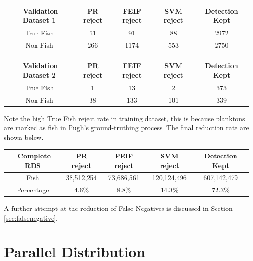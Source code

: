 \documentclass[bsc,logo,twoside,fullspacing,parskip]{infthesis}
\begin{document}
\begin{center}
\begin{tabular}{|c|c|c|c|c|}
\hline 
$ $ Validation Dataset 1 & PR reject & FEIF reject & SVM reject & Detection Kept\\
\hline 
True Fish & 61 & 91 & 88 & 2972 \\
Non Fish & 266 & 1174  & 553 & 2750 \\
\hline 
\end{tabular}
\end{center}

\begin{center}
\begin{tabular}{|c|c|c|c|c|}
\hline 
$ $ Validation Dataset 2 & PR reject & FEIF reject & SVM reject & Detection Kept\\
\hline 
True Fish & 1 & 13  & 2 & 373 \\
Non Fish & 38 & 133 & 101 & 339 \\
\hline 
\end{tabular}
\end{center}

Note the high True Fish reject rate in training dataset, this is because planktons are marked as fish in Pugh's ground-truthing process. The final reduction rate are shown below.

\begin{center}
\begin{tabular}{|c|c|c|c|c|}
\hline 
$ $ Complete RDS & PR reject & FEIF reject & SVM reject & Detection Kept\\
\hline 
Fish & 38,512,254 & 73,686,561  & 120,124,496 & 607,142,479 \\
Percentage & 4.6\% & 8.8\% & 14.3\% & 72.3\% \\
\hline 
\end{tabular}
\end{center}

A further attempt at the reduction of False Negatives is discussed in Section \ref{sec:falsenegative}.


\chapter{Parallel Distribution}
\label{chap:parallel}
\end{document}
